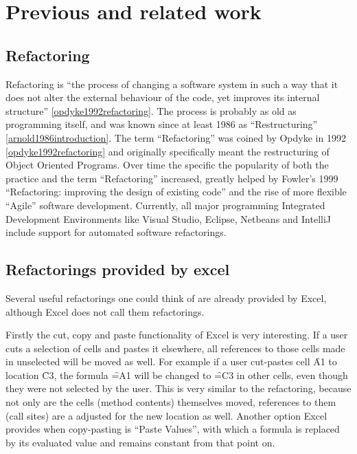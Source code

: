 
\chapter{Previous and related work}
\label{chapter:previouswork}

\section{Refactoring}

Refactoring is ``the process of changing a software system in such a way that it does not alter the external behaviour of the code, yet improves its internal structure'' \ref{opdyke1992refactoring}.
The process is probably as old as programming itself, and was known since at least 1986 as ``Restructuring'' \ref{arnold1986introduction}.
The term ``Refactoring'' was coined by Opdyke in 1992 \ref{opdyke1992refactoring} and originally specifically meant the restructuring of Object Oriented Programs. 
Over time the specific the popularity of both the practice and the term ``Refactoring'' increased, greatly helped by Fowler's 1999 ``Refactoring: improving the design of existing code'' \cite{fowler1999refactoring} and the rise of more flexible ``Agile'' software development.
Currently, all major programming Integrated Development Environments like Visual Studio, Eclipse, Netbeans and IntelliJ include support for automated software refactorings.

\section{Refactorings provided by excel}

Several useful refactorings one could think of are already provided by Excel, although Excel does not call them refactorings.

Firstly the cut, copy and paste functionality of Excel is very interesting.
If a user cuts a selection of cells and pastes it elsewhere, all references to those cells made in unselected will be moved as well.
For example if a user cut-pastes cell \f{A1} to location \f{C3}, the formula \f{=A1} will be changed to \f{=C3} in other cells, even though they were not selected by the user.
This is very similar to the  \cite{fowler1999refactoring} refactoring, because not only are the cells (method contents) themselves moved, references to them (call sites) are a adjusted for the new location as well.
Another option Excel provides when copy-pasting is ``Paste Values'', with which a formula is replaced by its evaluated value and remains constant from that point on.

